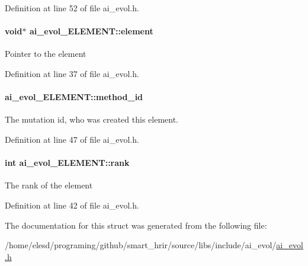 Definition at line 52 of file ai\-\_\-evol.\-h.

\hypertarget{a00001_a35a0ba554bf0676ec76c481e1468d835}{
\paragraph[{element}]{\setlength{\rightskip}{0pt plus 5cm}void$\ast$ ai\-\_\-evol\-\_\-\-E\-L\-E\-M\-E\-N\-T\-::element}}\label{a00001_a35a0ba554bf0676ec76c481e1468d835}
Pointer to the element 

Definition at line 37 of file ai\-\_\-evol.\-h.

\hypertarget{a00001_a5c392b9ad7400ff3f96c1b6105a82fce}{
\paragraph[{method\-\_\-id}]{ ai\-\_\-evol\-\_\-\-E\-L\-E\-M\-E\-N\-T\-::method\-\_\-id}}\label{a00001_a5c392b9ad7400ff3f96c1b6105a82fce}
The mutation id, who was created this element. 

Definition at line 47 of file ai\-\_\-evol.\-h.

\hypertarget{a00001_a0ccdc51cab1f06849e6518518f1888e5}{
\paragraph[{rank}]{\setlength{\rightskip}{0pt plus 5cm}int ai\-\_\-evol\-\_\-\-E\-L\-E\-M\-E\-N\-T\-::rank}}\label{a00001_a0ccdc51cab1f06849e6518518f1888e5}
The rank of the element 

Definition at line 42 of file ai\-\_\-evol.\-h.



The documentation for this struct was generated from the following file\-:\begin{DoxyCompactItemize}
\item 
/home/elesd/programing/github/smart\-\_\-hrir/source/libs/include/ai\-\_\-evol/\hyperlink{a00008}{ai\-\_\-evol.\-h}\end{DoxyCompactItemize}
